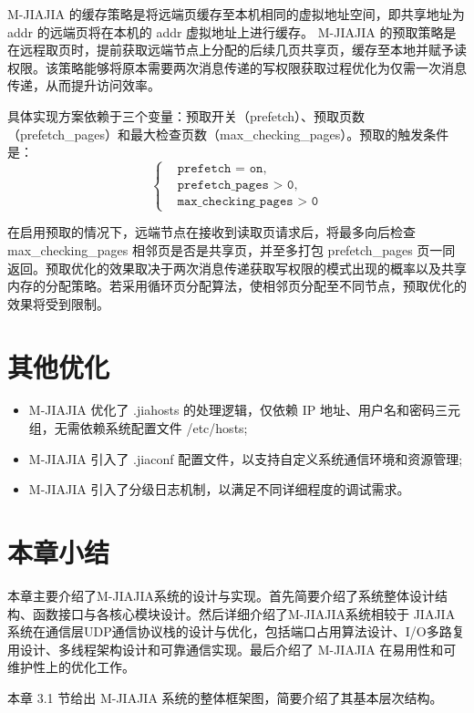 {    M-JIAJIA 的缓存策略是将远端页缓存至本机相同的虚拟地址空间，即共享地址为 addr 的远端页将在本机的 addr 虚拟地址上进行缓存。
    M-JIAJIA 的预取策略是在远程取页时，提前获取远端节点上分配的后续几页共享页，缓存至本地并赋予读权限。该策略能够将原本需要两次消息传递的写权限获取过程优化为仅需一次消息传递，从而提升访问效率。

    具体实现方案依赖于三个变量：预取开关（prefetch）、预取页数（prefetch\_pages）和最大检查页数（max\_checking\_pages）。预取的触发条件是：
    $$
        \left\{
        \begin{aligned}
             & \texttt{prefetch = on},           \\
             & \texttt{prefetch\_pages > 0},     \\
             & \texttt{max\_checking\_pages > 0}
        \end{aligned}
        \right.
    $$

    在启用预取的情况下，远端节点在接收到读取页请求后，将最多向后检查 max\_checking\_pages 相邻页是否是共享页，并至多打包 prefetch\_pages 页一同返回。预取优化的效果取决于两次消息传递获取写权限的模式出现的概率以及共享内存的分配策略。若采用循环页分配算法，使相邻页分配至不同节点，预取优化的效果将受到限制。


    \section{其他优化}
    \begin{itemize}
        \item M-JIAJIA 优化了 .jiahosts 的处理逻辑，仅依赖 IP 地址、用户名和密码三元组，无需依赖系统配置文件 /etc/hosts;
        \item M-JIAJIA 引入了 .jiaconf 配置文件，以支持自定义系统通信环境和资源管理;
        \item M-JIAJIA 引入了分级日志机制，以满足不同详细程度的调试需求。
    \end{itemize}

    \section{本章小结}
    本章主要介绍了M-JIAJIA系统的设计与实现。首先简要介绍了系统整体设计结构、函数接口与各核心模块设计。然后详细介绍了M-JIAJIA系统相较于 JIAJIA 系统在通信层UDP通信协议栈的设计与优化，包括端口占用算法设计、I/O多路复用设计、多线程架构设计和可靠通信实现。最后介绍了 M-JIAJIA 在易用性和可维护性上的优化工作。

    本章 3.1 节给出 M-JIAJIA 系统的整体框架图，简要介绍了其基本层次结构。

}
